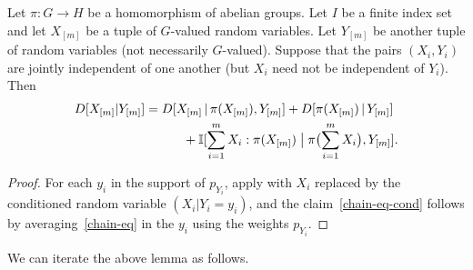   \begin{lemma}\label{multidist-chain-rule-cond}\leanok
    Let $\pi \colon G \to H$ be a homomorphism of abelian groups.
    Let $I$ be a finite index set and let $X_{[m]}$ be a tuple of $G$-valued random variables.
    Let $Y_{[m]}$ be another tuple of random variables (not necessarily $G$-valued).
    Suppose that the pairs $(X_i, Y_i)$ are jointly independent of one another (but $X_i$ need not be independent of $Y_i$).
    Then
    \begin{align}\nonumber
        D[ X_{[m]} | Y_{[m]} ] &=  D[ X_{[m]} \,|\, \pi(X_{[m]}), Y_{[m]}] + D[ \pi(X_{[m]}) \,|\, Y_{[m]}] \\
         &\quad\qquad + \mathbb{I}[ \sum_{i=1}^m X_i : \pi(X_{[m]}) \; \big| \;  \pi\bigl(\sum_{i=1}^m X_i \bigr), Y_{[m]} ].\label{chain-eq-cond}
    \end{align}
  \end{lemma}

  \begin{proof}
  For each $y_i$ in the support of $p_{Y_i}$, apply  with $X_i$ replaced by the conditioned random variable $(X_i|Y_i=y_i)$, and the claim~\eqref{chain-eq-cond} follows by averaging~\eqref{chain-eq} in the $y_i$ using the weights $p_{Y_i}$.
  \end{proof}

  We can iterate the above lemma as follows.

